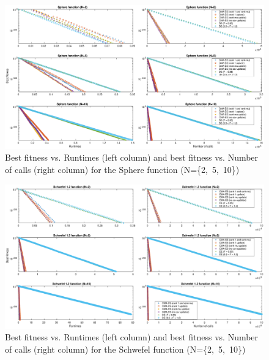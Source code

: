 \documentclass[12pt]{article}
\begin{document}
\begin{landscape}
\thispagestyle{empty}
    \begin{figure}
        \hspace*{-4.5cm}
        \includegraphics[width=1.5\linewidth]{pics/sphere.eps}
        \caption{Best fitness vs. Runtimes (left column) and
        best fitness vs. Number of calls (right column)
        for the Sphere function (N=\{2,~5,~10\})}
        \label{fig:sphere}
    \end{figure}
\end{landscape}

\begin{landscape}
\thispagestyle{empty}
    \begin{figure}
        \hspace*{-4.5cm}
        \includegraphics[width=1.5\linewidth]{pics/schwefel.eps}
        \caption{Best fitness vs. Runtimes (left column) and
        best fitness vs. Number of calls (right column)
        for the Schwefel function (N=\{2,~5,~10\})}
        \label{fig:schwefel}
    \end{figure}
\end{landscape}
\end{document}
